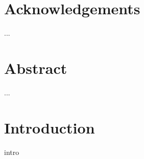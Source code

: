 \documentclass{report}
\begin{document}
\maketitle



%


\chapter*{\center Acknowledgements}%
%
...
\chapter*{\center Abstract}%
%
...


\tableofcontents





\chapter{Introduction}
intro
\end{document}
